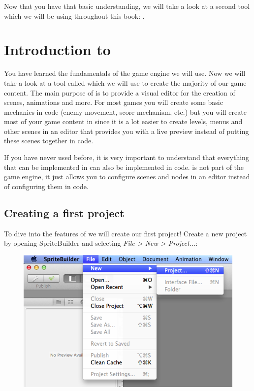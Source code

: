 Now that you have that basic understanding, we will take a look at a second tool which we will be using throughout this book: \SB{}.

\section{Introduction to \SB{}}
You have learned the fundamentals of the game engine we will use. Now we will
take a look at a tool called \SB{} which we will use to create the majority of
our game content. The main purpose of \SB{} is to provide a visual editor for
the creation of scenes, animations and more. For most games you will create some
basic mechanics in code (enemy movement, score mechanism, etc.) but you will create
 most of your game content in \SB{} since it is a lot easier to create
levels, menus and other scenes in an editor that provides you with a live
preview instead of putting these scenes together in code.

If you have never used \SB{} before, it is very important to understand that
everything that can be implemented in \SB{} can also be implemented in code.
\SB{} is not part of the game engine, it just allows you to configure \cocos{}
scenes and nodes in an editor instead of configuring them in code.

\subsection{Creating a first project}
To dive into the features of \SB{} we will create our first project! 
Create a new project by opening SpriteBuilder and selecting \textit{File > New >
Project...}:
\begin{figure}[H]
		\centering
		\includegraphics[width=0.9\linewidth]{images/cocos2d/setup/spritebuilder_new_project.png}     
\end{figure}

